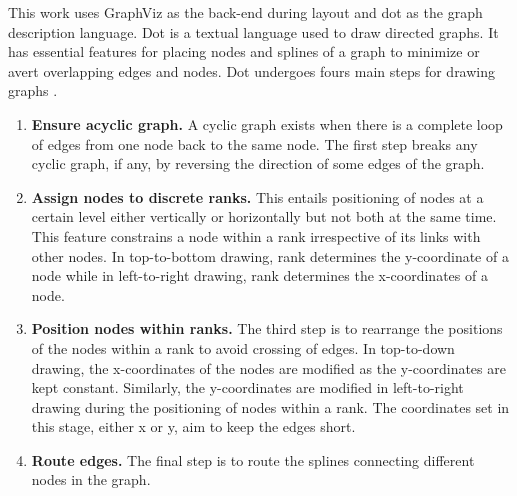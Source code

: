 This work uses GraphViz as the back-end during layout and dot as the graph description language. Dot is a textual language used to draw directed graphs. It has essential features for placing nodes and splines of a graph to minimize or avert overlapping edges and nodes. Dot undergoes fours main steps for drawing graphs \cite{gansner2006drawing}.

\begin{enumerate}
\item \textbf{Ensure acyclic graph.} A cyclic graph exists when there is a complete loop of edges from one node back to the same node. The first step breaks any cyclic graph, if any, by reversing the direction of some edges of the graph.
\item \textbf{Assign nodes to discrete ranks.} This entails positioning of nodes at a certain level either vertically or horizontally but not both at the same time. This feature constrains a node within a rank irrespective of its links with other nodes. In top-to-bottom drawing, rank determines the y-coordinate of a node while in left-to-right drawing, rank determines the x-coordinates of a node.
\item \textbf{Position nodes within ranks.} The third step is to rearrange the positions of the nodes within a rank to avoid crossing of edges. In top-to-down drawing, the x-coordinates of the nodes are modified as the y-coordinates are kept constant. Similarly, the y-coordinates are modified in left-to-right drawing during the positioning of nodes within a rank. The coordinates set in this stage, either x or y, aim to keep the edges short.
\item \textbf{Route  edges.} The final step is to route the splines connecting different nodes in the graph.
\end{enumerate}

